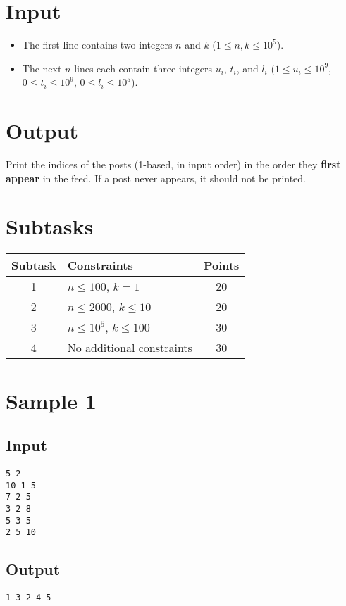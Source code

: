 \documentclass[12pt,a4paper]{article}
\begin{document}
\section*{Input}
\begin{itemize}
    \item The first line contains two integers $n$ and $k$ ($1 \leq n, k \leq 10^5$).  
    \item The next $n$ lines each contain three integers $u_i$, $t_i$, and $l_i$ ($1 \leq u_i \leq 10^9$, $0 \leq t_i \leq 10^9$, $0 \leq l_i \leq 10^5$).  
\end{itemize}

\section*{Output}
Print the indices of the posts (1-based, in input order) in the order they \textbf{first appear} in the feed.  
If a post never appears, it should not be printed.

\section*{Subtasks}
\begin{center}
\begin{tabularx}{\textwidth}{|c|X|c|}
\hline
\textbf{Subtask} & \textbf{Constraints} & \textbf{Points} \\
\hline
1 & $n \leq 100$, $k = 1$ & 20 \\
\hline
2 & $n \leq 2000$, $k \leq 10$ & 20 \\
\hline
3 & $n \leq 10^5$, $k \leq 100$ & 30 \\
\hline
4 & No additional constraints & 30 \\
\hline
\end{tabularx}
\end{center}

\section*{Sample 1}
\subsection*{Input}
\begin{verbatim}
5 2
10 1 5
7 2 5
3 2 8
5 3 5
2 5 10
\end{verbatim}

\subsection*{Output}
\begin{verbatim}
1 3 2 4 5
\end{verbatim}
\end{document}
